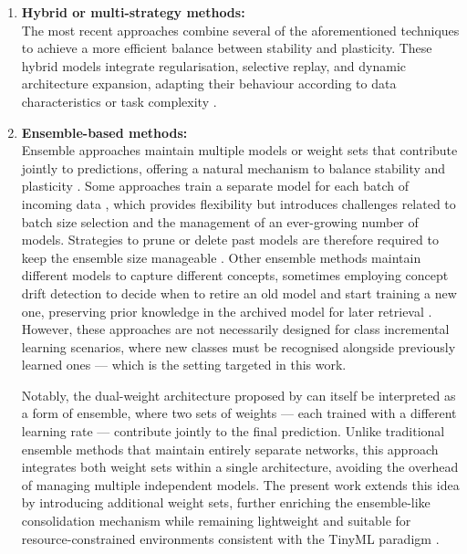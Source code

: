 \begin{enumerate}
    \item \textbf{Hybrid or multi-strategy methods:} \\
    The most recent approaches combine several of the aforementioned techniques to achieve 
    a more efficient balance between stability and plasticity. These hybrid models integrate 
    regularisation, selective replay, and dynamic architecture expansion, adapting their 
    behaviour according to data characteristics or task complexity 
    \cite{de2021continual, sarkar2025adaptive}.

\item \textbf{Ensemble-based methods:} \\
    Ensemble approaches maintain multiple models or weight sets that contribute jointly to 
    predictions, offering a natural mechanism to balance stability and plasticity 
    \cite{krawczyk2017ensemble, gomes2017survey}. Some approaches train a separate model 
    for each batch of incoming data \cite{polikar2001learn++}, which provides flexibility 
    but introduces challenges related to batch size selection and the management of an 
    ever-growing number of models. Strategies to prune or delete past models are therefore 
    required to keep the ensemble size manageable \cite{krawczyk2017ensemble}. Other 
    ensemble methods maintain different models to capture different concepts, sometimes 
    employing concept drift detection to decide when to retire an old model and start 
    training a new one, preserving prior knowledge in the archived model for later 
    retrieval \cite{gomes2017survey}. However, these approaches are not necessarily 
    designed for class incremental learning scenarios, where new classes must be 
    recognised alongside previously learned ones --- which is the setting targeted in 
    this work.

    Notably, the dual-weight architecture proposed by \cite{bullinaria2009} can itself 
    be interpreted as a form of ensemble, where two sets of weights --- each trained with 
    a different learning rate --- contribute jointly to the final prediction. Unlike 
    traditional ensemble methods that maintain entirely separate networks, this approach 
    integrates both weight sets within a single architecture, avoiding the overhead of 
    managing multiple independent models. The present work extends this idea by 
    introducing additional weight sets, further enriching the ensemble-like consolidation 
    mechanism while remaining lightweight and suitable for resource-constrained 
    environments consistent with the TinyML paradigm \cite{warden2019tinyml}.
\end{enumerate}

